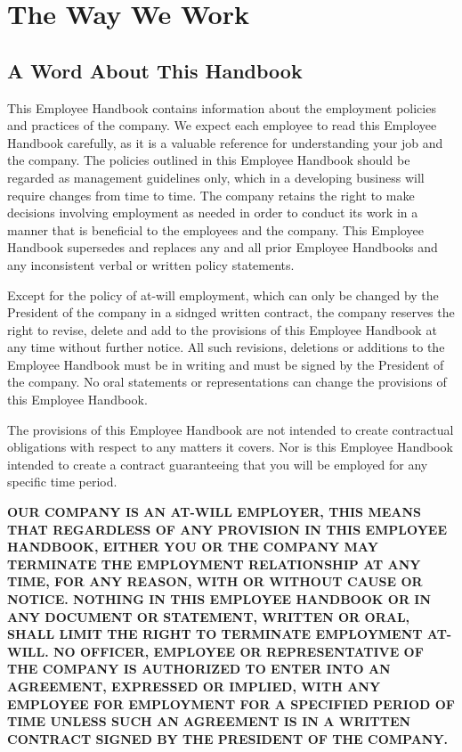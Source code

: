 \section{The Way We Work}

\subsection{A Word About This Handbook}

This Employee Handbook contains information about the employment policies and practices of the company. We expect each employee to read this Employee Handbook carefully, as it is a valuable reference for understanding your job and the company. The policies outlined in this Employee Handbook should be regarded as management guidelines only, which in a developing business will require changes from time to time. The company retains the right to make decisions involving employment as needed in order to conduct its work in a manner that is beneficial to the employees and the company. This Employee Handbook supersedes and replaces any and all prior Employee Handbooks and any inconsistent verbal or written policy statements.

Except for the policy of at-will employment, which can only be changed by the President of the company in a sidnged written contract, the company reserves the right to revise, delete and add to the provisions of this Employee Handbook at any time without further notice. All such revisions, deletions or additions to the Employee Handbook must be in writing and must be signed by the President of the company. No oral statements or representations can change the provisions of this Employee Handbook.

The provisions of this Employee Handbook are not intended to create contractual obligations with respect to any matters it covers. Nor is this Employee Handbook intended to create a contract guaranteeing that you will be employed for any specific time period.

\textbf{OUR COMPANY IS AN AT-WILL EMPLOYER, THIS MEANS THAT REGARDLESS OF ANY PROVISION IN THIS EMPLOYEE HANDBOOK, EITHER YOU OR THE COMPANY MAY TERMINATE THE EMPLOYMENT RELATIONSHIP AT ANY TIME, FOR ANY REASON, WITH OR WITHOUT CAUSE OR NOTICE. NOTHING IN THIS EMPLOYEE HANDBOOK OR IN ANY DOCUMENT OR STATEMENT, WRITTEN OR ORAL, SHALL LIMIT THE RIGHT TO TERMINATE EMPLOYMENT AT-WILL. NO OFFICER, EMPLOYEE OR REPRESENTATIVE OF THE COMPANY IS AUTHORIZED TO ENTER INTO AN AGREEMENT, EXPRESSED OR IMPLIED, WITH ANY EMPLOYEE FOR EMPLOYMENT FOR A SPECIFIED PERIOD OF TIME UNLESS SUCH AN AGREEMENT IS IN A WRITTEN CONTRACT SIGNED BY THE PRESIDENT OF THE COMPANY.}

